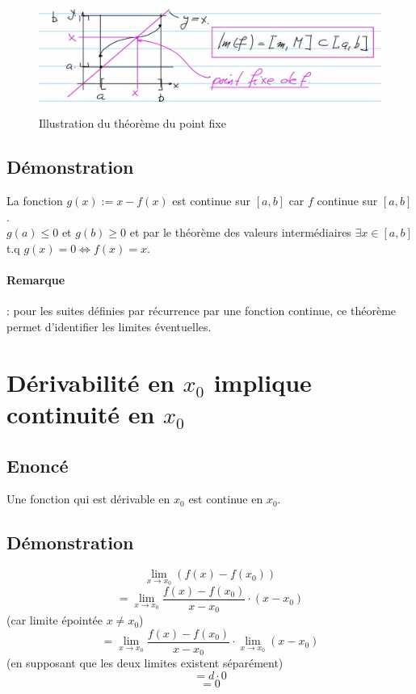 \documentclass{article}
\begin{document}
\begin{figure}[htp]
    \centering
    \includegraphics[width=12cm]{Images/pointfixe.png}
    \caption{Illustration du théorème du point fixe}
    \label{fig:complex}
\end{figure} 

\subsection{Démonstration}

La fonction $ g(x) := x - f(x) $ est continue sur $ [a, b] $ car $ f $ continue sur $ [a, b] $.\\
$ g(a) \leq 0 $ et $ g(b) \geq 0 $ et par le théorème des valeurs intermédiaires $ \exists x \in [a, b] $ t.q $ g(x) = 0 \Leftrightarrow f(x) = x $.

\paragraph{Remarque}: pour les suites définies par récurrence par une fonction continue, ce théorème permet d'identifier les limites éventuelles.

\newpage

\section{Dérivabilité en $x_0$ implique continuité en $x_0$}

\subsection{Enoncé}

Une fonction qui est dérivable en $x_0$ est continue en $x_0$.

\subsection{Démonstration}

\[ \lim_{x\to{x_0}} (f(x) - f(x_0)) \]
\[ = \lim_{x\to{x_0}} \frac{f(x) - f(x_0)}{x-{x_0}} \cdot (x-{x_0}) \] (car limite épointée $ x \neq x_0 $)
\[ = \lim_{x\to{x_0}} \frac{f(x) - f(x_0)}{x-{x_0}} \cdot \lim_{x\to{x_0}} (x-{x_0})\] (en supposant que les deux limites existent séparément)
\[ = d \cdot 0 \]
\[ = 0 \]
\end{document}
